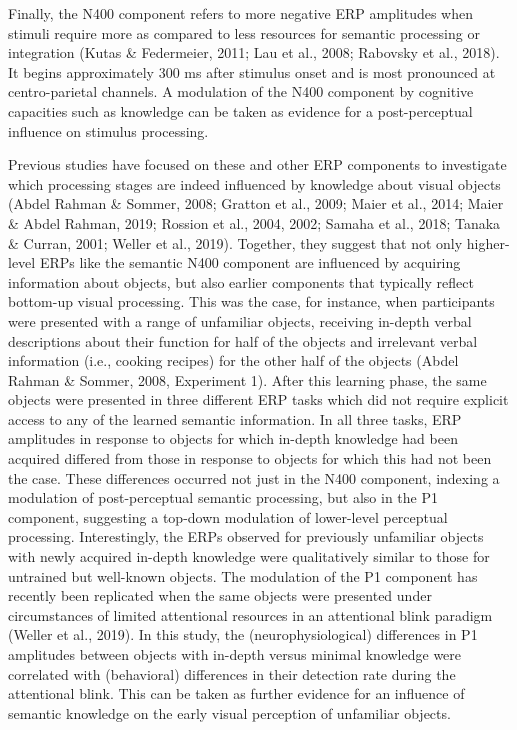 \documentclass[
  english,
  doc,12pt,twoside,floatsintext]{apa7}
\begin{document}
Finally, the N400 component refers to more negative ERP amplitudes when stimuli require more as compared to less resources for semantic processing or integration (Kutas \& Federmeier, 2011; Lau et al., 2008; Rabovsky et al., 2018). It begins approximately 300 ms after stimulus onset and is most pronounced at centro-parietal channels. A modulation of the N400 component by cognitive capacities such as knowledge can be taken as evidence for a post-perceptual influence on stimulus processing.

Previous studies have focused on these and other ERP components to investigate which processing stages are indeed influenced by knowledge about visual objects (Abdel Rahman \& Sommer, 2008; Gratton et al., 2009; Maier et al., 2014; Maier \& Abdel Rahman, 2019; Rossion et al., 2004, 2002; Samaha et al., 2018; Tanaka \& Curran, 2001; Weller et al., 2019). Together, they suggest that not only higher-level ERPs like the semantic N400 component are influenced by acquiring information about objects, but also earlier components that typically reflect bottom-up visual processing. This was the case, for instance, when participants were presented with a range of unfamiliar objects, receiving in-depth verbal descriptions about their function for half of the objects and irrelevant verbal information (i.e., cooking recipes) for the other half of the objects (Abdel Rahman \& Sommer, 2008, Experiment 1). After this learning phase, the same objects were presented in three different ERP tasks which did not require explicit access to any of the learned semantic information. In all three tasks, ERP amplitudes in response to objects for which in-depth knowledge had been acquired differed from those in response to objects for which this had not been the case. These differences occurred not just in the N400 component, indexing a modulation of post-perceptual semantic processing, but also in the P1 component, suggesting a top-down modulation of lower-level perceptual processing. Interestingly, the ERPs observed for previously unfamiliar objects with newly acquired in-depth knowledge were qualitatively similar to those for untrained but well-known objects. The modulation of the P1 component has recently been replicated when the same objects were presented under circumstances of limited attentional resources in an attentional blink paradigm (Weller et al., 2019). In this study, the (neurophysiological) differences in P1 amplitudes between objects with in-depth versus minimal knowledge were correlated with (behavioral) differences in their detection rate during the attentional blink. This can be taken as further evidence for an influence of semantic knowledge on the early visual perception of unfamiliar objects.
\end{document}
